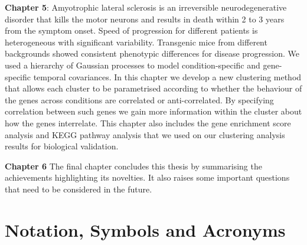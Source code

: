 \textbf{Chapter 5}:
Amyotrophic lateral sclerosis is an irreversible neurodegenerative disorder that kills the motor neurons and results in death within 2 to 3 years from the symptom onset.  Speed of progression for different patients is heterogeneous with significant variability. Transgenic mice from different backgrounds showed consistent phenotypic differences for disease progression. We used a hierarchy of Gaussian processes to model condition-specific and gene-specific temporal covariances. In this chapter we develop a new clustering method that allows each cluster to be parametrised according to whether the behaviour of the genes across conditions are correlated or anti-correlated. By specifying correlation between such genes we gain more information within the cluster about how the genes interrelate. This chapter also includes the gene enrichment score analysis and KEGG pathway analysis that we used on our clustering analysis results for biological validation.

\textbf{Chapter 6}
The final chapter concludes this thesis by summarising the achievements highlighting its novelties. It also raises some important questions that need to be considered in the future.

\clearpage
\section{Notation, Symbols and Acronyms}

